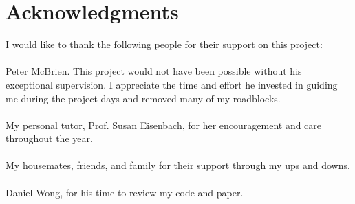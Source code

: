 \cleardoublepage
{}
{}
\chapter*{Acknowledgments}
\vspace{1.0in}
I would like to thank the following people for their support on this project:\\
\\
Peter McBrien. This project would not have been possible without his exceptional supervision. I appreciate the time and effort he invested in guiding me during the project days and removed many of my roadblocks.\\
\\
My personal tutor, Prof. Susan Eisenbach, for her encouragement and care throughout the year.\\
\\
My housemates, friends, and family for their support through my ups and downs. \\
\\
Daniel Wong, for his time to review my code and paper.\\
\\
\\
\\
\\
\\
\newpage
